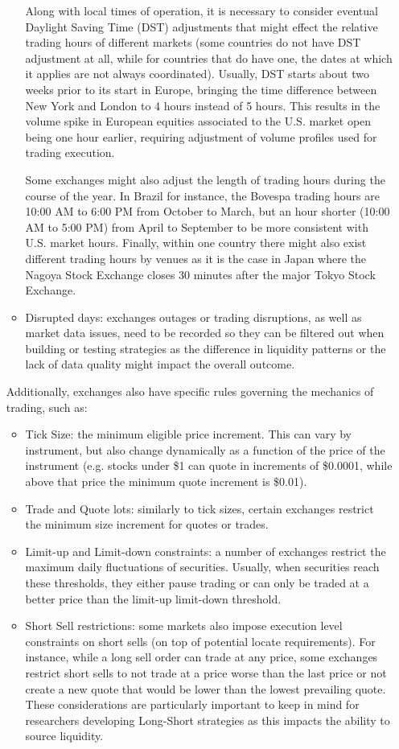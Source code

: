 \begin{itemize}
\begin{itemize}
Along with local times of operation, it is necessary to consider eventual Daylight Saving Time (DST) adjustments that might effect the relative trading hours of different markets (some countries do not have DST adjustment at all, while for countries that do have one, the dates at which it applies are not always coordinated). Usually, DST starts about two weeks prior to its start in Europe, bringing the time difference between New York and London to 4 hours instead of 5 hours. This results in the volume spike in European equities associated to the U.S. market open being one hour earlier, requiring adjustment of volume profiles used for trading execution.

Some exchanges might also adjust the length of trading hours during the course of the year. In Brazil for instance, the Bovespa trading hours are 10:00 AM to 6:00 PM from October to March, but an hour shorter (10:00 AM to 5:00 PM) from April to September to be more consistent with U.S. market hours.
Finally, within one country there might also exist different trading hours by venues as it is the case in Japan where the Nagoya Stock Exchange closes 30 minutes after the major Tokyo Stock Exchange.


\item Disrupted days: exchanges outages or trading disruptions, as well as market data issues, need to be recorded so they can be filtered out when building or testing strategies as the difference in liquidity patterns or the lack of data quality might impact the overall outcome.
\end{itemize}


Additionally, exchanges also have specific rules governing the mechanics of trading, such as:
\begin{itemize}
\item Tick Size: the minimum eligible price increment. This can vary by instrument, but also change dynamically as a function of the price of the instrument (e.g. stocks under \$1 can quote in increments of \$0.0001, while above that price the minimum quote increment is \$0.01).
\item Trade and Quote lots: similarly to tick sizes, certain exchanges restrict the minimum size increment for quotes or trades.
\item Limit-up and Limit-down constraints: a number of exchanges restrict the maximum daily fluctuations of securities. Usually, when securities reach these thresholds, they either pause trading or can only be traded at a better price than the limit-up limit-down threshold.
\item Short Sell restrictions: some markets also impose execution level constraints on short sells (on top of potential locate requirements). For instance, while a long sell order can trade at any price, some exchanges restrict short sells to not trade at a price worse than the last price or not create a new quote that would be lower than the lowest prevailing quote. These considerations are particularly important to keep in mind for researchers developing Long-Short strategies as this impacts the ability to source liquidity.
\end{itemize}


\end{itemize}
